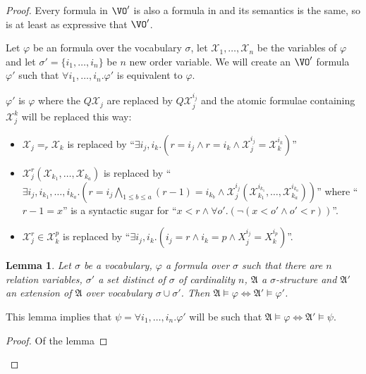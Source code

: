 \documentclass[a4paper,12pt]{article}
\newtheorem{lemma}[theorem]{Lemma}
\theoremstyle{definition}
\renewcommand{\phi}{\varphi}
\newcommand{\mc}{\mathcal}
\newcommand{\mf}{\mathfrak}
\begin{document}
\begin{proof}Every formula in $\VO'$ is also a formula in \VO{} and
  its semantics is the same, so \VO{} is at least as expressive that
  $\VO'$.

  Let $\phi$ be an \VO{} formula over the vocabulary $\sigma$, let
  $\mc X_1,\dots,\mc X_n$ be the variables of $\phi$ and let
  $\sigma'=\{i_1,\dots, i_n\}$ be $n$ new order variable. We will
  create an $\VO'$ formula $\phi'$ such that $\forall
  i_1,\dots,i_n.\phi'$ is equivalent to $\phi$.

  $\phi'$ is $\phi$ where the $Q\mc X_j$ are replaced by $Q\mc
  X_j^{i_j}$ and the atomic formulae containing $\mc X_j^k$ will be
  replaced this way:
  \begin{itemize}
  \item $\mc X_j=_r\mc X_k$ is replaced by ``$\exists
    i_j,i_k.(r=i_j\land r=i_k\land \mc X_j^{i_j}=\mc X_k^{i_k})$''
  \item{}$\mc X_j^r(\mathcal X_{k_1},\dots,\mathcal X_{k_a})$ is
    replaced by ``$\exists
    i_j,i_{k_1},\dots,i_{k_a}.(r=i_j\bigwedge_{1\le b\le a}
    (r-1)=i_{k_b}\land \mc X_j^{i_j}(\mathcal
    X_{k_1}^{i_{k_1}},\dots,\mathcal X_{k_a}^{i_{k_a}}))$'' where
    ``$r-1=x$'' is a syntactic sugar for ``$x<r\land\forall o'. (
    \neg(x<o'\land o'<r))$''.
  \item{}$\mc X_j^r\in \mc X_k^p$ is replaced by ``$\exists
    i_j,i_k.(i_j=r\land i_k=p\land X_j^{i_j}=X_k^{i_p})$''.

  \end{itemize}

  \begin{lemma}Let $\sigma$ be a vocabulary, $\phi$ a formula over
    $\sigma$ such that there are $n$ relation variables, $\sigma'$ a
    set distinct of $\sigma$ of cardinality $n$, $\mf A$ a
    $\sigma$-structure and $\mf A'$ an extension of $\mf A$ over
    vocabulary $\sigma\cup\sigma'$. Then $\mf A\models
    \phi\Leftrightarrow \mf A'\models\phi'$.
\end{lemma}
This lemma implies that $\psi=\forall i_1,\dots,i_n.\phi'$ will be such
that $\mf A\models \phi\Leftrightarrow \mf A'\models\psi$.

\begin{proof}Of the lemma
  

\end{proof}
\end{proof}
\end{document}
